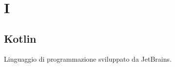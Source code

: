 \section{I}
     \subsection{Kotlin}
          Linguaggio di programmazione sviluppato da JetBrains.
\newpage